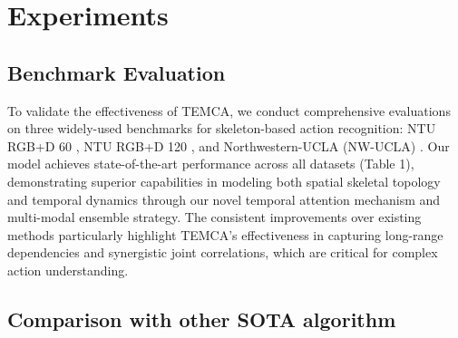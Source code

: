 \section{Experiments}

\subsection{Benchmark Evaluation}

To validate the effectiveness of TEMCA, we conduct comprehensive 
evaluations on three widely-used benchmarks for skeleton-based action 
recognition: NTU RGB+D 60 \cite{ref1}, NTU RGB+D 120 \cite{ref2}, and 
Northwestern-UCLA (NW-UCLA) \cite{ref17}. Our model achieves 
state-of-the-art performance across all datasets (Table 1), 
demonstrating superior capabilities in modeling both spatial skeletal 
topology and temporal dynamics through our novel temporal attention 
mechanism and multi-modal ensemble strategy. The consistent improvements 
over existing methods particularly highlight TEMCA's effectiveness in 
capturing long-range dependencies and synergistic joint correlations, 
which are critical for complex action understanding.




\subsection{Comparison with other SOTA algorithm}

